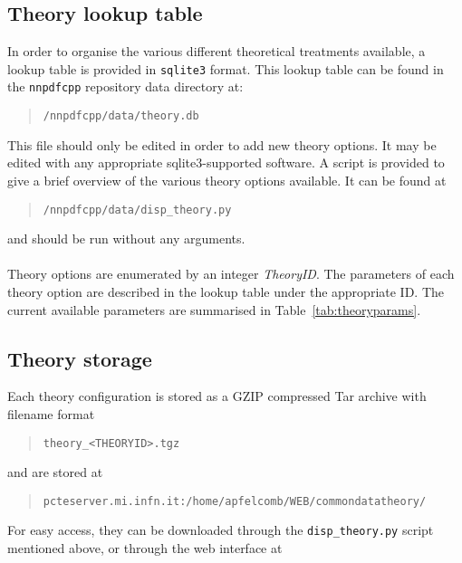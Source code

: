\documentclass[11pt]{article}
\begin{document}
\subsection{Theory lookup table}
In order to organise the various different theoretical treatments available, a lookup table
is provided in {\tt sqlite3} format. This lookup table can be found in the {\tt nnpdfcpp} repository data directory at:
\begin{quotation}
    {\tt /nnpdfcpp/data/theory.db}
\end{quotation}
This file should only be edited in order to add new theory options. It may be edited with any appropriate sqlite3-supported software. A script is provided to give a brief overview of the various theory options available. It can be found at
\begin{quotation}
    {\tt /nnpdfcpp/data/disp\_theory.py}
\end{quotation}
and should be run without any arguments.
\\\\
Theory options are enumerated by an integer {\it TheoryID}. The parameters of each theory option are described in the lookup table under the appropriate ID. The current available parameters are summarised in Table~\ref{tab:theoryparams}.

\subsection{Theory storage}

Each theory configuration is stored as a GZIP compressed Tar archive with filename format
\begin{quotation}
    {\tt theory\_<THEORYID>.tgz}
\end{quotation}
and are stored at
\begin{quotation}
    {\tt pcteserver.mi.infn.it:/home/apfelcomb/WEB/commondatatheory/}
\end{quotation}
For easy access, they can be downloaded through the {\tt disp\_theory.py} script mentioned above, or through the web interface at
\end{document}
